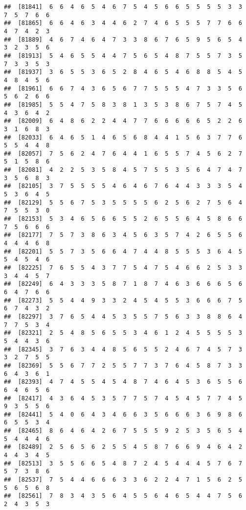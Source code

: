 \documentclass[
]{book}
\begin{document}
\begin{verbatim}
##  [81841]  6  6  4  6  5  4  6  7  5  4  5  6  6  5  5  5  5  3  3  7  5  7  6  6
##  [81865]  6  6  4  6  3  4  4  6  2  7  4  6  5  5  5  7  7  6  6  4  7  4  2  3
##  [81889]  4  6  7  4  6  4  7  3  3  8  6  7  6  5  9  5  6  5  4  3  2  3  5  6
##  [81913]  5  4  6  5  5  4  4  7  5  6  5  4  8  7  5  5  7  3  5  7  3  3  5  3
##  [81937]  3  6  5  5  3  6  5  2  8  4  6  5  4  6  8  8  5  4  5  4  8  4  5  6
##  [81961]  6  6  7  4  3  6  5  6  7  7  5  5  5  4  7  3  3  5  6  5  6  2  6  6
##  [81985]  5  5  4  7  5  8  3  8  1  3  5  3  8  6  7  5  7  4  5  4  3  6  4  2
##  [82009]  6  4  8  6  2  2  4  4  7  7  6  6  6  6  6  5  2  2  6  3  1  6  8  3
##  [82033]  6  4  6  5  1  4  6  5  6  8  4  4  1  5  6  3  7  7  6  5  5  4  4  8
##  [82057]  7  5  6  2  4  7  6  4  4  1  6  5  5  7  4  5  6  2  7  5  1  5  8  6
##  [82081]  4  2  2  5  3  5  8  4  5  7  5  5  3  5  6  4  7  4  7  3  5  6  8  3
##  [82105]  3  7  5  5  5  5  4  6  4  6  7  6  4  4  3  3  3  5  4  5  3  6  4  5
##  [82129]  5  5  6  7  5  3  5  5  5  5  6  2  5  6  2  7  5  6  4  7  5  5  3  0
##  [82153]  5  3  4  6  5  6  6  5  5  2  6  5  5  6  4  5  8  6  6  7  5  6  6  6
##  [82177]  7  5  7  3  8  6  3  4  5  6  3  5  7  4  2  6  5  5  6  4  4  4  6  8
##  [82201]  5  5  7  3  5  6  6  4  7  4  4  8  5  5  5  3  6  4  5  5  4  5  4  6
##  [82225]  7  6  5  5  4  3  7  7  5  4  7  5  4  6  6  2  5  3  3  3  4  4  5  7
##  [82249]  6  4  3  3  3  5  8  7  1  8  7  4  6  3  6  6  6  5  6  6  4  7  6  6
##  [82273]  5  5  4  4  9  3  3  2  4  5  4  5  5  3  6  6  6  7  5  6  7  4  3  2
##  [82297]  3  7  6  5  4  4  5  3  5  5  7  5  6  3  3  8  8  6  4  7  7  5  3  4
##  [82321]  2  5  4  8  5  6  5  5  3  4  6  1  2  4  5  5  5  5  3  5  4  4  3  6
##  [82345]  3  7  6  3  4  4  8  5  6  5  5  2  4  6  7  4  5  7  3  3  2  7  5  5
##  [82369]  5  5  6  7  7  2  5  5  7  7  3  7  6  4  5  8  7  3  3  6  4  3  6  1
##  [82393]  4  7  4  5  5  4  5  4  8  7  4  6  4  5  3  6  5  5  6  6  4  6  5  6
##  [82417]  4  3  6  4  5  3  5  7  7  5  7  4  5  4  5  7  7  4  5  9  3  5  5  6
##  [82441]  5  4  0  6  4  3  4  6  6  3  5  6  6  6  3  6  9  8  6  6  5  5  3  4
##  [82465]  8  6  4  6  4  2  6  7  5  5  5  9  2  5  3  5  6  5  4  5  4  4  4  6
##  [82489]  2  5  6  5  6  2  5  5  4  5  8  7  6  6  9  4  6  4  2  4  4  3  4  5
##  [82513]  3  5  5  6  6  5  4  8  7  2  4  5  4  4  4  5  7  6  7  5  7  3  8  6
##  [82537]  7  5  4  4  6  6  6  3  3  6  2  2  4  7  1  5  6  2  5  5  6  5  6  8
##  [82561]  7  8  3  4  3  5  6  4  5  5  6  4  6  5  4  4  7  5  6  2  4  3  5  3

\end{verbatim}
\end{document}
